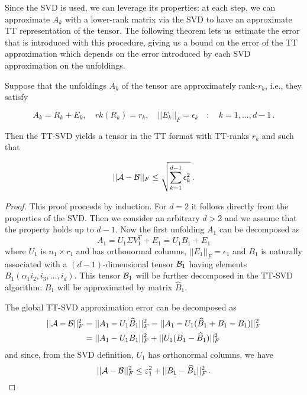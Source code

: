 Since the SVD is used, we can leverage its properties: at each step, we can approximate $A_k$ with a lower-rank matrix via the SVD to have an approximate TT representation of the tensor. The following theorem lets us estimate the error that is introduced with this procedure, giving us a bound on the error of the TT approximation which depends on the error introduced by each SVD approximation on the unfoldings.

\begin{Teo} \label{teo:ttsvd_approx}
  Suppose that the unfoldings $A_k$ of the tensor \A are approximately rank-$r_k$, i.e., they satisfy

  \begin{equation} \label{teo:ttsvd_approx:ip:1}
  A_k = R_k + E_k, \quad rk(R_k) = r_k, \quad ||E_k||_F = \epsilon_k \quad:\quad k = 1,\ldots,d-1\, .
  \end{equation}

  Then the TT-SVD yields a tensor \B in the TT format with TT-ranks $r_k$ and such that

  \begin{equation*}
    ||\mathcal{A} - \mathcal{B} ||_F \le \sqrt{\sum_{k=1}^{d-1} \epsilon_k^2}\, .
  \end{equation*}
  
  \begin{proof}
    This proof proceeds by induction. For $d=2$ it follows directly from the properties of the SVD. Then we consider an arbitrary $d > 2$ and we assume that the property holds up to $d - 1$.  Now the first unfolding $A_1$ can be decomposed as
    \begin{equation*}
    A_1 = U_1 \Sigma V_1^T + E_1 = U_1 B_1 + E_1
    \end{equation*}
    where $U_1$ is $n_1 \times r_1$ and has orthonormal columns, $||E_1||_F = \epsilon_1$ and $B_1$ is naturally associated with a $(d-1)$-dimensional tensor $\mathcal{B}_1$ having elements $B_1(\alpha_1i_2,i_3,\ldots,i_d)$. This tensor $\mathcal{B}_1$ will be further decomposed in the TT-SVD algorithm: $B_1$ will be approximated by matrix $\hat{B}_1$.

    The global TT-SVD approximation error can be decomposed as
    \begin{equation*}
      \begin{split}
        ||\mathcal{A}-\mathcal{B}||_F^2 &= ||A_1 - U_1\widehat{B}_1||_F^2 = ||A_1 - U_1(\widehat{B}_1 + B_1 - B_1)||_F^2 \\
         &= ||A_1 - U_1 B_1||_F^2 + ||U_1(B_1 - \widehat{B}_1)||_F^2
      \end{split}
    \end{equation*}
    and since, from the SVD definition, $U_1$ has orthonormal columns, we have
    \begin{equation} \label{teo:ttsvd_approx:proof:bound}
      ||\mathcal{A} - \mathcal{B}||_F^2 \le \varepsilon_1^2 + ||B_1 - \widehat{B}_1 ||_F^2\, .
    \end{equation}


\end{proof}
\end{Teo}
